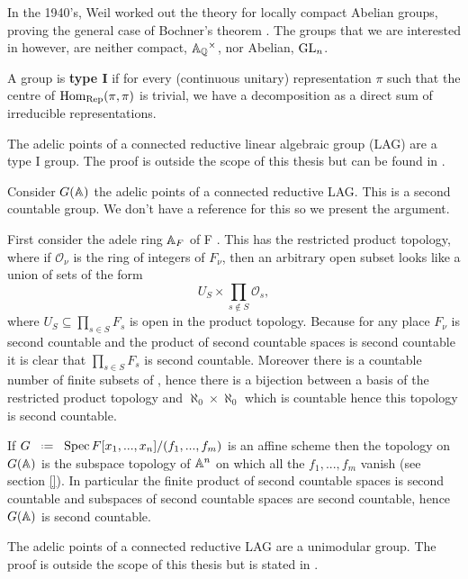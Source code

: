 In the 1940's, Weil worked out the theory for locally compact Abelian groups, proving the general case of Bochner's theorem \cite[Thm. 4.18]{follandCourseAbstractHarmonic2016a}. The groups that we are interested in however, are neither compact,  \(\A_\Q^\times\), nor Abelian, \(\operatorname{GL}_n\).

A group is \textbf{type I} if for every (continuous unitary) representation \(\pi\) such that the centre of \(\operatorname{Hom}_\mathrm{Rep}(\pi, \pi)\) is trivial, we have a decomposition as a  direct sum of irreducible representations. 

\begin{example}
	The adelic points of a connected reductive linear algebraic group (LAG) are a type I group. The proof is outside the scope of this thesis but can be found in \cite[Thm. 1.7 + Thm. 2.3]{deitmarTraceClassGroups2017}.
\end{example}

\begin{example}
	Consider \(G(\A)\) the adelic points of a connected reductive LAG. This is a second countable group. We don't have a reference for this so we present the argument. 
	
	First consider the adele ring \(\A_F\) of F . This has the restricted product topology, where if \(\mathcal{O}_\nu\) is the ring of integers of \(F_\nu\), then an arbitrary open subset looks like a union of sets of the form 
	\[U_S \times \prod_{s\notin S} \mathcal{O}_s,\]
	where \(U_S\subseteq \prod_{s\in S}F_s\) is open in the product topology. 
	Because for any place \(F_\nu\) is second countable and the product of second countable spaces is second countable it is clear that \(\prod_{s\in S} F_s\) is second countable. Moreover there is a countable number of finite subsets of \Z, hence there is a bijection between a basis of the restricted product topology and \(\aleph_0\times \aleph_0 \) which is countable hence this topology is second countable.
	
	If \(G \defeq \Spec F[x_1, ..., x_n]/(f_1, ..., f_m)\) is an affine scheme then the topology on \(G(\A)\) is the subspace topology of \(\A^n\) on which all the \(f_1, ..., f_m\) vanish (see section \ref{}). In particular the finite product of second countable spaces is second countable and subspaces of second countable spaces are second countable, hence \(G(\A)\) is second countable. 
\end{example}

\begin{example}
	The adelic points of a connected reductive LAG are a unimodular group. The proof is outside the scope of this thesis but is stated in \cite[Lem. 2]{conradCOMPACTNESSVOLUMEADELIC}.
\end{example}


